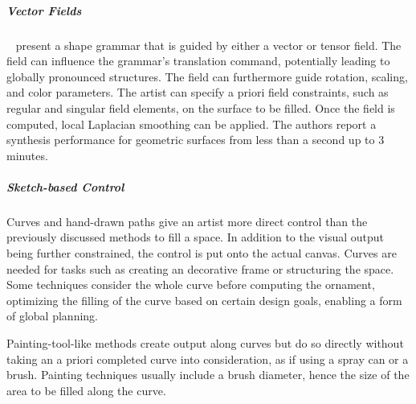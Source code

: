 \subparagraph{Vector Fields}
\label{subpara:analysis_rulebased_vector_fields}

\citeauthor*{yuanyuan_2011_gso}~\cite{yuanyuan_2011_gso} present a shape grammar that is guided by either a vector or tensor field. The field can influence the grammar's translation command, potentially leading to globally pronounced structures. The field can furthermore guide rotation, scaling, and color parameters. The artist can specify a priori field constraints, such as regular and singular field elements, on the surface to be filled. Once the field is computed, local Laplacian smoothing can be applied. The authors report a synthesis performance for geometric surfaces from less than a second up to 3 minutes.

\subparagraph{Sketch-based Control}
\label{subpara:analysis_rulebased_sketchbased}

Curves and hand-drawn paths give an artist more direct control than the previously discussed methods to fill a space. In addition to the visual output being further constrained, the control is put onto the actual canvas. Curves are needed for tasks such as creating an decorative frame or structuring the space. Some techniques consider the whole curve before computing the ornament, optimizing the filling of the curve based on certain design goals, enabling a form of global planning.

Painting-tool-like methods create output along curves but do so directly without taking an a priori completed curve into consideration, as if using a spray can or a brush. Painting techniques usually include a brush diameter, hence the size of the area to be filled along the curve.



